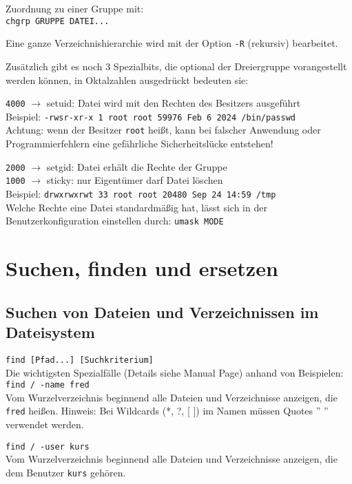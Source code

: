 \documentclass[11pt]{article}
\begin{document}
Zuordnung zu einer Gruppe mit:\\
\texttt{chgrp GRUPPE DATEI...}

Eine ganze Verzeichnishierarchie wird mit der Option \texttt{-R} (rekursiv)
bearbeitet.

Zusätzlich gibt es noch 3 Spezialbits, die optional der Dreiergruppe vorangestellt werden können, in Oktalzahlen ausgedrückt bedeuten sie:

\texttt{4000} $ \rightarrow $ setuid: Datei wird mit den Rechten des Besitzers ausgeführt \\
Beispiel: \texttt{-rwsr-xr-x 1 root root 59976 Feb  6  2024 /bin/passwd} \\
Achtung: wenn der Besitzer \texttt{root} heißt, kann bei falscher Anwendung oder Programmierfehlern eine gefährliche Sicherheitslücke entstehen!

\texttt{2000} $ \rightarrow $ setgid: Datei erhält die Rechte der Gruppe \\

\texttt{1000} $ \rightarrow $ sticky: nur Eigentümer darf Datei löschen \\
Beispiel: \texttt{drwxrwxrwt 33 root root 20480 Sep 24 14:59 /tmp} \\

Welche Rechte eine Datei standardmäßig hat, lässt sich in der
Benutzerkonfiguration einstellen durch:
\texttt{umask MODE}

\section{Suchen, finden und ersetzen}
\subsection{Suchen von Dateien und Verzeichnissen im Dateisystem}
\texttt{find [Pfad...] [Suchkriterium]}\\

Die wichtigsten Spezialfälle (Details siehe Manual Page) anhand
von Beispielen:\\

\texttt{find / -name fred} \\
Vom Wurzelverzeichnis beginnend alle Dateien und Verzeichnisse
anzeigen, die \texttt{fred} heißen. Hinweis: Bei Wildcards (*, ?, [ ])
im Namen müssen Quotes '' '' verwendet werden.

\texttt{find / -user kurs} \\
Vom Wurzelverzeichnis beginnend alle Dateien und Verzeichnisse
anzeigen, die dem Benutzer \texttt{kurs} gehören.
\end{document}
